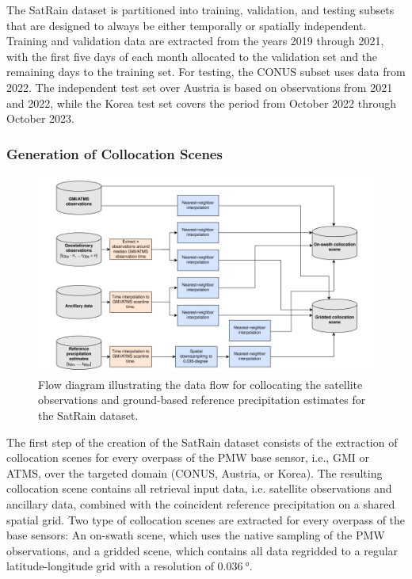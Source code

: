 \documentclass[11pt]{article}
\begin{document}
The SatRain dataset is partitioned into training, validation, and testing
subsets that are designed to always be either temporally or spatially
independent. Training and validation data are extracted from the years 2019
through 2021, with the first five days of each month allocated to the validation
set and the remaining days to the training set. For testing, the CONUS subset
uses data from 2022. The independent test set over Austria is based on
observations from 2021 and 2022, while the Korea test set covers the period from
October 2022 through October 2023.

\subsubsection{Generation of Collocation Scenes}

\begin{figure}[htbp]
	\centering
	\includegraphics[width=1.0\textwidth]{figures/fig07}
	\caption{
		Flow diagram illustrating the data flow for collocating the satellite
		observations and ground-based reference precipitation estimates for the SatRain
		dataset.
	}
	\label{fig:data_flow}
\end{figure}

The first step of the creation of the SatRain dataset consists of the extraction
of collocation scenes for every overpass of the PMW base sensor, i.e., GMI or
ATMS, over the targeted domain (CONUS, Austria, or Korea). The resulting
collocation scene contains all retrieval input data, i.e. satellite observations
and ancillary data, combined with the coincident reference precipitation on a
shared spatial grid. Two type of collocation scenes are extracted for every
overpass of the base sensors: An on-swath scene, which uses the native sampling
of the PMW observations, and a gridded scene, which contains all data regridded
to a regular latitude-longitude grid with a resolution of $\SI{0.036}{\degree}$.
\end{document}
